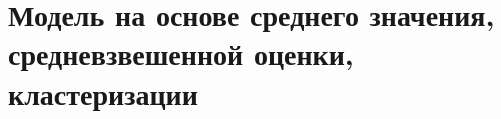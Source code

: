 \documentclass[bachelor, och, diploma]{SCWorks}
\begin{document}
%

%



\appendix

\section{Модель на основе среднего значения, средневзвешенной оценки, кластеризации}
\end{document}
